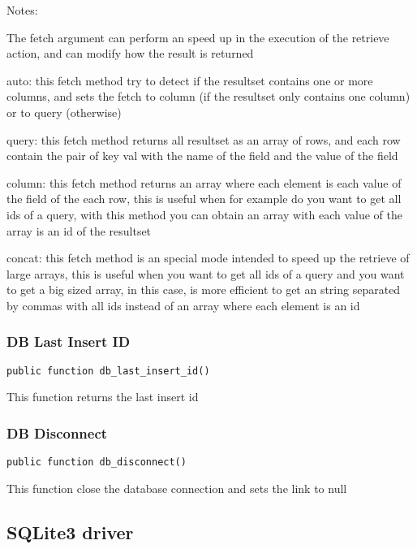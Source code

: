 \documentclass[a4paper]{article}
\begin{document}
Notes:

The fetch argument can perform an speed up in the execution of the retrieve action, and
can modify how the result is returned

auto: this fetch method try to detect if the resultset contains one or more columns, and
sets the fetch to column (if the resultset only contains one column) or to query (otherwise)

query: this fetch method returns all resultset as an array of rows, and each row contain the
pair of key val with the name of the field and the value of the field

column: this fetch method returns an array where each element is each value of the field of
the each row, this is useful when for example do you want to get all ids of a query, with
this method you can obtain an array with each value of the array is an id of the resultset

concat: this fetch method is an special mode intended to speed up the retrieve of large
arrays, this is useful when you want to get all ids of a query and you want to get a big
sized array, in this case, is more efficient to get an string separated by commas with all
ids instead of an array where each element is an id

\hypertarget{toc352}{}
\subsubsection{DB Last Insert ID}

\begin{lstlisting}
public function db_last_insert_id()
\end{lstlisting}

This function returns the last insert id

\hypertarget{toc353}{}
\subsubsection{DB Disconnect}

\begin{lstlisting}
public function db_disconnect()
\end{lstlisting}

This function close the database connection and sets the link to null

\hypertarget{toc354}{}
\subsection{SQLite3 driver}
\end{document}
